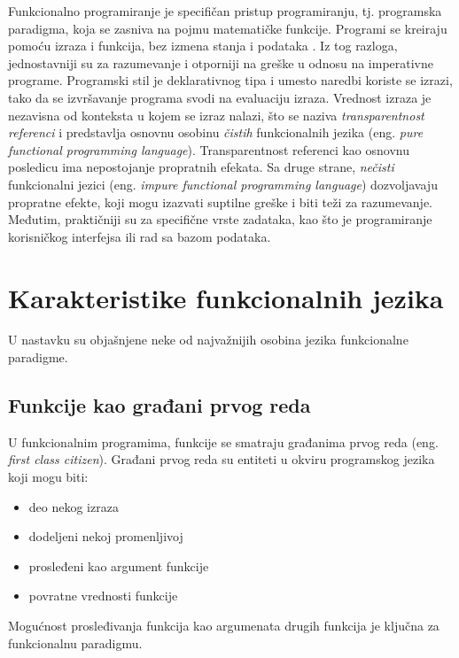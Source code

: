 \documentclass[12pt,oneside]{memoir}
\begin{document}
\par Funkcionalno programiranje je specifičan pristup programiranju, tj. programska paradigma, koja se zasniva na pojmu matematičke funkcije. Programi se kreiraju pomoću izraza i funkcija, bez izmena stanja i podataka \cite{func}. Iz tog razloga, jednostavniji su za razumevanje i otporniji na greške u odnosu na imperativne programe. Programski stil je deklarativnog tipa i umesto naredbi koriste se izrazi, tako da se izvršavanje programa svodi na evaluaciju izraza. Vrednost izraza je nezavisna od konteksta u kojem se izraz nalazi, što se naziva \emph{transparentnost referenci} i predstavlja osnovnu osobinu \emph{čistih} funkcionalnih jezika (eng. \textit{pure functional programming language}). Transparentnost referenci kao osnovnu posledicu ima nepostojanje propratnih efekata. Sa druge strane, \emph{nečisti} funkcionalni jezici (eng. \textit{impure functional programming language}) dozvoljavaju propratne efekte, koji mogu izazvati suptilne greške i biti teži za razumevanje. Međutim, praktičniji su za specifične vrste zadataka, kao što je programiranje korisničkog interfejsa ili rad sa bazom podataka. 


\section{Karakteristike funkcionalnih jezika}
U nastavku su objašnjene neke od najvažnijih osobina jezika funkcionalne paradigme. 

\subsection{Funkcije kao građani prvog reda}
U funkcionalnim programima, funkcije se smatraju građanima prvog reda (eng. \emph{first class citizen}). Građani prvog reda su entiteti u okviru programskog jezika koji mogu biti:
\begin{itemize}
\item deo nekog izraza
\item dodeljeni nekoj promenljivoj
\item prosleđeni kao argument funkcije
\item povratne vrednosti funkcije
\end{itemize}
Mogućnost prosleđivanja funkcija kao argumenata drugih funkcija je ključna za funkcionalnu paradigmu. 
\end{document}
